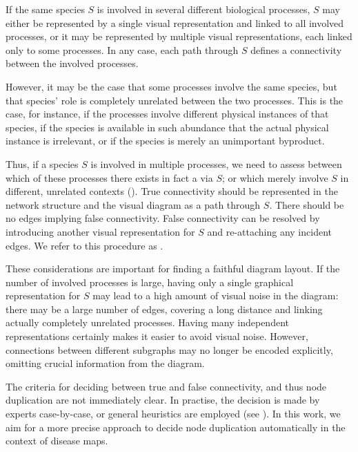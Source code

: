 \documentclass[
	fontsize=10pt, %
	twoside=false, %
	secnumdepth=1, %
  toc=indentunnumbered %
]{kaobook}
\begin{document}
If the same species $S$ is involved in several different biological processes,
$S$ may either be represented by a single visual representation and linked to
all involved processes, or it may be represented by multiple visual
representations, each linked only to some processes.
%
In any case, each path through $S$ defines a connectivity
between the involved processes.

However, it may be the case that some processes involve the same
species, but that species' role is completely unrelated between the two
processes. This is the case, for instance, if the processes involve different
physical instances of that species, if the species is available in such
abundance that the actual physical instance is irrelevant, or if the species is
merely an unimportant byproduct.

Thus, if a species $S$ is involved in multiple processes, we need to assess
between which of these processes there exists in fact a 
via $S$; or which merely involve $S$ in different, unrelated contexts
().
%
True connectivity should be represented in the network structure and the visual
diagram as a path through $S$. There should be no edges implying false
connectivity.
False connectivity can be resolved by introducing another visual representation
for $S$ and re-attaching any incident edges. We refer to this procedure as
.

These considerations are important for finding a faithful diagram layout.
If the number of involved processes is large, having only a single graphical
representation for $S$ may lead to a high amount of visual noise in the diagram: there
may be a large number of edges, covering a long distance and linking actually
completely unrelated processes.
%
Having many independent representations
certainly makes it easier to avoid visual noise. However, connections between
different subgraphs may no longer be encoded explicitly, omitting crucial
information from the diagram.

The criteria for deciding between true and false connectivity, and thus node
duplication are not immediately clear. In practise, the decision is made by
experts case-by-case, or general heuristics are employed (see
). In this work, we aim for a more precise approach to
decide node duplication automatically in the context of disease maps.
\end{document}
